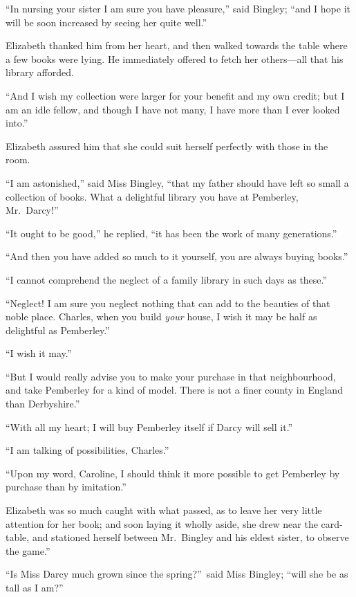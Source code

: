 \documentclass[12pt,english]{book}
\begin{document}
{}``In nursing your sister I am sure you have pleasure,'' said Bingley;
{}``and I hope it will be soon increased by seeing her quite well.''

Elizabeth thanked him from her heart, and then walked towards the
table where a few books were lying. He immediately offered to fetch
her others\mbox{---}all that his library afforded.

{}``And I wish my collection were larger for your benefit and my
own credit; but I am an idle fellow, and though I have not many, I
have more than I ever looked into.''

Elizabeth assured him that she could suit herself perfectly with those
in the room.

{}``I am astonished,'' said Miss Bingley, {}``that my father should
have left so small a collection of books. What a delightful library
you have at Pemberley, Mr.\ Darcy!''\ 

{}``It ought to be good,'' he replied, {}``it has been the work
of many generations.''

{}``And then you have added so much to it yourself, you are always
buying books.''

{}``I cannot comprehend the neglect of a family library in such days
as these.''

{}``Neglect! I am sure you neglect nothing that can add to the beauties
of that noble place. Charles, when you build \textit{your} house,
I wish it may be half as delightful as Pemberley.''

{}``I wish it may.''

{}``But I would really advise you to make your purchase in that neighbourhood,
and take Pemberley for a kind of model. There is not a finer county
in England than Derbyshire.''

{}``With all my heart; I will buy Pemberley itself if Darcy will
sell it.''

{}``I am talking of possibilities, Charles.''

{}``Upon my word, Caroline, I should think it more possible to get
Pemberley by purchase than by imitation.''

Elizabeth was so much caught with what passed, as to leave her very
little attention for her book; and soon laying it wholly aside, she
drew near the card-table, and stationed herself between Mr.\ Bingley
and his eldest sister, to observe the game.''

{}``Is Miss Darcy much grown since the spring?''\ said Miss Bingley;
{}``will she be as tall as I am?''\ 
\end{document}
